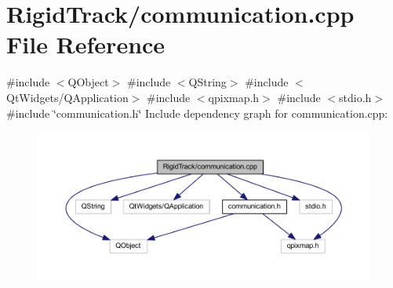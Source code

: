 \section{Rigid\+Track/communication.cpp File Reference}
\label{communication_8cpp}
{\ttfamily \#include $<$Q\+Object$>$}\newline
{\ttfamily \#include $<$Q\+String$>$}\newline
{\ttfamily \#include $<$Qt\+Widgets/\+Q\+Application$>$}\newline
{\ttfamily \#include $<$qpixmap.\+h$>$}\newline
{\ttfamily \#include $<$stdio.\+h$>$}\newline
{\ttfamily \#include \char`\"{}communication.\+h\char`\"{}}\newline
Include dependency graph for communication.\+cpp\+:\nopagebreak
\begin{figure}[H]
\begin{center}
\leavevmode
\includegraphics[width=350pt]{communication_8cpp__incl}
\end{center}
\end{figure}

